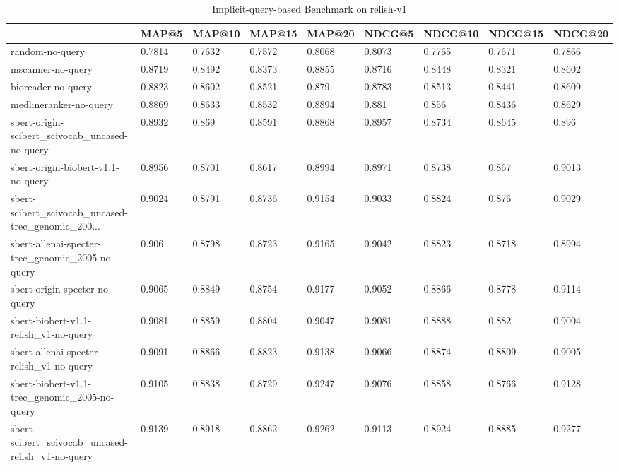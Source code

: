 \begin{table}
\centering
\caption{Implicit-query-based Benchmark on relish-v1}
\label{tab:noquery-benchmark-relish-v1}
\begin{tabular}{lllllllll}
\toprule
{} &    MAP@5 &  MAP@10 &  MAP@15 &  MAP@20 &   NDCG@5 & NDCG@10 & NDCG@15 & NDCG@20 \\
\midrule
random-no-query                                    &   0.7814 &  0.7632 &  0.7572 &  0.8068 &   0.8073 &  0.7765 &  0.7671 &  0.7866 \\
mscanner-no-query                                  &   0.8719 &  0.8492 &  0.8373 &  0.8855 &   0.8716 &  0.8448 &  0.8321 &  0.8602 \\
bioreader-no-query                                 &   0.8823 &  0.8602 &  0.8521 &   0.879 &   0.8783 &  0.8513 &  0.8441 &  0.8609 \\
medlineranker-no-query                             &   0.8869 &  0.8633 &  0.8532 &  0.8894 &    0.881 &   0.856 &  0.8436 &  0.8629 \\
sbert-origin-scibert\_scivocab\_uncased-no-query     &   0.8932 &   0.869 &  0.8591 &  0.8868 &   0.8957 &  0.8734 &  0.8645 &   0.896 \\
sbert-origin-biobert-v1.1-no-query                 &   0.8956 &  0.8701 &  0.8617 &  0.8994 &   0.8971 &  0.8738 &   0.867 &  0.9013 \\
sbert-scibert\_scivocab\_uncased-trec\_genomic\_200... &   0.9024 &  0.8791 &  0.8736 &  0.9154 &   0.9033 &  0.8824 &   0.876 &  0.9029 \\
sbert-allenai-specter-trec\_genomic\_2005-no-query   &    0.906 &  0.8798 &  0.8723 &  0.9165 &   0.9042 &  0.8823 &  0.8718 &  0.8994 \\
sbert-origin-specter-no-query                      &   0.9065 &  0.8849 &  0.8754 &  0.9177 &   0.9052 &  0.8866 &  0.8778 &  0.9114 \\
sbert-biobert-v1.1-relish\_v1-no-query              &   0.9081 &  0.8859 &  0.8804 &  0.9047 &   0.9081 &  0.8888 &   0.882 &  0.9004 \\
sbert-allenai-specter-relish\_v1-no-query           &   0.9091 &  0.8866 &  0.8823 &  0.9138 &   0.9066 &  0.8874 &  0.8809 &  0.9005 \\
sbert-biobert-v1.1-trec\_genomic\_2005-no-query      &   0.9105 &  0.8838 &  0.8729 &  0.9247 &   0.9076 &  0.8858 &  0.8766 &  0.9128 \\
sbert-scibert\_scivocab\_uncased-relish\_v1-no-query  &   0.9139 &  0.8918 &  0.8862 &  0.9262 &   0.9113 &  0.8924 &  0.8885 &  0.9277 \\
\bottomrule
\end{tabular}
\end{table}


